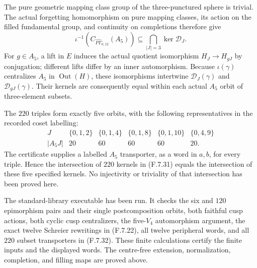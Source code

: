 The pure geometric mapping class group of the
three-punctured sphere is trivial.  The actual
forgetting homomorphism on pure mapping classes,
its action on the filled fundamental group, and
continuity on completions therefore give
\[
 \iota^{-1}\!\left(
       C_{\widehat{P\Gamma}_{0,12}}(A_5)\right)
               \subseteq\bigcap_{|J|=3}\ker\mathcal D_J.
                                                               \tag{F.7.31}
\]
For $g\in A_5$, a lift in $E$ induces the actual
quotient isomorphism $H_J\to H_{gJ}$ by conjugation;
different lifts differ by an inner automorphism.
Because $\iota(\gamma)$ centralizes $A_5$ in
$\operatorname{Out}(H)$, these isomorphisms intertwine
$\mathcal D_J(\gamma)$ and $\mathcal D_{gJ}(\gamma)$.
Their kernels are consequently equal within each
actual $A_5$ orbit of three-element subsets.

The $220$ triples form exactly five orbits, with
the following representatives in the recorded coset
labelling:
\[
 \begin{array}{c|ccccc}
 J&\{0,1,2\}&\{0,1,4\}&\{0,1,8\}&\{0,1,10\}&\{0,4,9\}\\
 |A_5J|&20&60&60&60&20 .
 \end{array}                                             \tag{F.7.32}
\]
The certificate supplies a labelled $A_5$ transporter,
as a word in $a,b$, for every triple.  Hence the
intersection of $220$ kernels in (F.7.31) equals the
intersection of these five specified kernels.
No injectivity or triviality of that intersection
has been proved here.

The standard-library executable
 has been run.
It checks the six and $120$ epimorphism pairs and
their single postcomposition orbits, both faithful
cusp actions, both cyclic cusp centralizers, the
five-$V_4$ automorphism argument, the exact twelve
Schreier rewritings in (F.7.22), all twelve peripheral
words, and all $220$ subset transporters in (F.7.32).
These finite calculations certify the finite inputs
and the displayed words.  The centre-free extension,
normalization, completion, and filling maps are
proved above.
